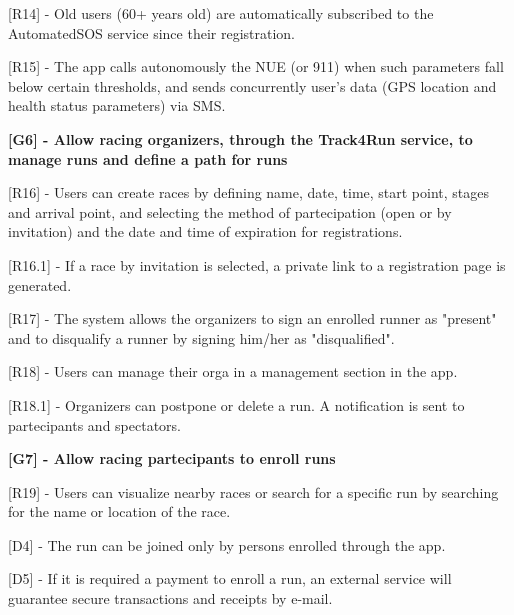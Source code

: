 [R14] - Old users (60+ years old) are automatically subscribed to the AutomatedSOS service since their registration. \newline

[R15] - The app calls autonomously the NUE (or 911) when such parameters fall below certain thresholds, and sends concurrently user's data (GPS location and health status parameters) via SMS. \newline

\hspace{-\parindent}\textbf{[G6] - Allow racing organizers, through the Track4Run service, to manage runs and define a path for runs} \newline

[R16] - Users can create races by defining name, date, time, start point, stages and arrival point, and selecting the method of partecipation (open or by invitation) and the date and time of expiration for registrations. \newline

\hspace{\parindent}[R16.1] - If a race by invitation is selected, a private link to a registration page is generated. \newline

[R17] - The system allows the organizers to sign an enrolled runner as "present" and to disqualify a runner by signing him/her as "disqualified". \newline

[R18] - Users can manage their orga in a management section in the app. \newline

\hspace{\parindent}[R18.1] - Organizers can postpone or delete a run. A notification is sent to partecipants and spectators. \newline

\hspace{-\parindent}\textbf{[G7] - Allow racing partecipants to enroll runs} \newline

[R19] - Users can visualize nearby races or search for a specific run by searching for the name or location of the race. \newline

[D4] - The run can be joined only by persons enrolled through the app. \newline

[D5] - If it is required a payment to enroll a run, an external service will guarantee secure transactions and receipts by e-mail. \newline

